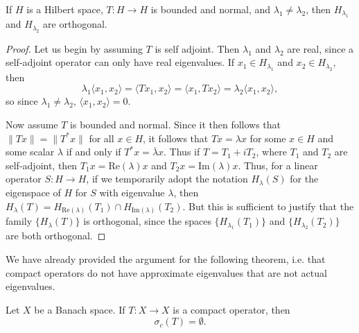 \begin{lemma}
    If $H$ is a Hilbert space, $T: H \to H$ is bounded and normal, and $\lambda_1 \neq \lambda_2$, then $H_{\lambda_1}$ and $H_{\lambda_2}$ are orthogonal.
\end{lemma}
\begin{proof}
    Let us begin by assuming $T$ is self adjoint. Then $\lambda_1$ and $\lambda_2$ are real, since a self-adjoint operator can only have real eigenvalues. If $x_1 \in H_{\lambda_1}$ and $x_2 \in H_{\lambda_2}$, then
    \[ \lambda_1 \langle x_1, x_2 \rangle = \langle Tx_1, x_2 \rangle = \langle x_1, Tx_2 \rangle = \lambda_2 \langle x_1, x_2 \rangle, \]
    so since $\lambda_1 \neq \lambda_2$, $\langle x_1, x_2 \rangle = 0$.

    Now assume $T$ is bounded and normal. Since it then follows that $\| Tx \| = \| T^* x \|$ for all $x \in H$, it follows that $Tx = \lambda x$ for some $x \in H$ and some scalar $\lambda$ if and only if $T^*x = \overline{\lambda} x$. Thus if $T = T_1 + i T_2$, where $T_1$ and $T_2$ are self-adjoint, then $T_1 x = \text{Re}(\lambda) x$ and $T_2 x = \text{Im}(\lambda) x$. Thus, for a linear operator $S: H \to H$, if we temporarily adopt the notation $H_\lambda(S)$ for the eigenspace of $H$ for $S$ with eigenvalue $\lambda$, then $H_\lambda(T) = H_{\text{Re}(\lambda)}(T_1) \cap H_{\text{Im}(\lambda)}(T_2)$. But this is sufficient to justify that the family $\{ H_\lambda(T) \}$ is orthogonal, since the spaces $\{ H_{\lambda_1}(T_1) \}$ and $\{ H_{\lambda_2}(T_2) \}$ are both orthogonal.
\end{proof}

We have already provided the argument for the following theorem, i.e. that compact operators do not have approximate eigenvalues that are not actual eigenvalues.

\begin{theorem}
    Let $X$ be a Banach space. If $T: X \to X$ is a compact operator, then
    \[ \sigma_c(T) = \emptyset. \]
\end{theorem}


